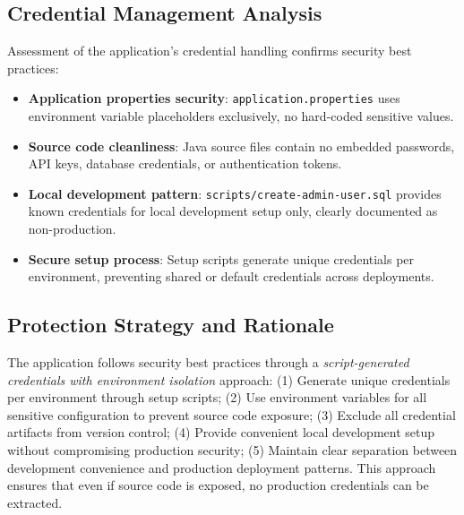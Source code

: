 \documentclass[]{UCD_CS_FYP_Report}
\begin{document}
\subsection{Credential Management Analysis}
Assessment of the application's credential handling confirms security best practices:
\begin{itemize}
	\item \textbf{Application properties security}: \texttt{application.properties} uses environment variable placeholders exclusively, no hard-coded sensitive values.
	\item \textbf{Source code cleanliness}: Java source files contain no embedded passwords, API keys, database credentials, or authentication tokens.
	\item \textbf{Local development pattern}: \texttt{scripts/create-admin-user.sql} provides known credentials for local development setup only, clearly documented as non-production.
	\item \textbf{Secure setup process}: Setup scripts generate unique credentials per environment, preventing shared or default credentials across deployments.
\end{itemize}

\subsection{Protection Strategy and Rationale}
The application follows security best practices through a \textit{script-generated credentials with environment isolation} approach: (1) Generate unique credentials per environment through setup scripts; (2) Use environment variables for all sensitive configuration to prevent source code exposure; (3) Exclude all credential artifacts from version control; (4) Provide convenient local development setup without compromising production security; (5) Maintain clear separation between development convenience and production deployment patterns. This approach ensures that even if source code is exposed, no production credentials can be extracted.
\end{document}
